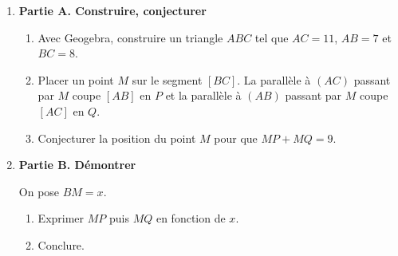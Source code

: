 

\begin{enumerate}
\item \textbf{Partie A. Construire, conjecturer}
\begin{enumerate}
\item Avec Geogebra, construire un triangle $ABC$ tel que $AC = 11$, $AB = 7$ et $BC = 8$.
\item Placer un point $M$ sur le segment $[BC]$. La parallèle à $(AC)$ passant par $M$ coupe $[AB]$ en $P$ et la parallèle à $(AB)$ passant par $M$ coupe $[AC]$ en $Q$.
\item Conjecturer la position du point $M$ pour que $MP + MQ = 9$.
\end{enumerate}
\item \textbf{Partie B. Démontrer}

On pose $BM=x$.
\begin{enumerate}
\item Exprimer $MP$ puis $MQ$ en fonction de $x$.
\item Conclure.
\end{enumerate}

\end{enumerate}